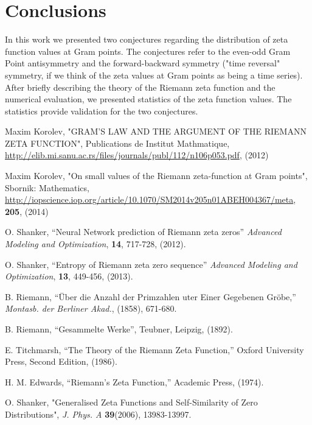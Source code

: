 \documentclass[twoside]{article}
\begin{document}
\section{\label{conclusions}Conclusions}

In this work we presented two conjectures regarding the distribution of zeta function values at Gram points. The conjectures refer to the even-odd Gram Point antisymmetry and the forward-backward symmetry ("time reversal" symmetry, if we think of the zeta values at Gram points as being a time series). After briefly describing the theory of the Riemann zeta function and the numerical evaluation, we presented statistics of the zeta function values. The statistics provide validation for the two conjectures.

 
\begin{thebibliography}{10} 

 Maxim Korolev,
"GRAM'S LAW AND THE ARGUMENT
OF THE RIEMANN ZETA FUNCTION", Publications de Institut Mathmatique,
\url{http://elib.mi.sanu.ac.rs/files/journals/publ/112/n106p053.pdf}, (2012)

 Maxim Korolev,
"On small values of the Riemann zeta-function at Gram points", Sbornik: Mathematics,
\url{http://iopscience.iop.org/article/10.1070/SM2014v205n01ABEH004367/meta},
{\bf205}, (2014)

 O. Shanker, ``Neural Network prediction of Riemann zeta zeros''
{\it Advanced Modeling and Optimization}, {\bf 14}, 717-728, (2012). 

 O. Shanker, ``Entropy of Riemann zeta zero sequence''
{\it Advanced Modeling and Optimization}, {\bf 13}, 449-456, (2013). 

 B. Riemann, ``\"{U}ber die Anzahl der Primzahlen uter
Einer Gegebenen Gr\"{o}be,'' {\it Montasb. der Berliner Akad.}, (1858),
671-680.

 B. Riemann, ``Gesammelte Werke'', Teubner, Leipzig, (1892).

 E. Titchmarsh, ``The Theory of the Riemann Zeta
Function,'' Oxford University Press, Second Edition, (1986).

 H. M. Edwards, ``Riemann's Zeta Function,'' 
Academic Press,  (1974).

 O. Shanker, 
"Generalised Zeta Functions and Self-Similarity of Zero Distributions",
{\it J.  Phys. A} {\bf39}(2006), 13983-13997.


\end{thebibliography}
\end{document}
